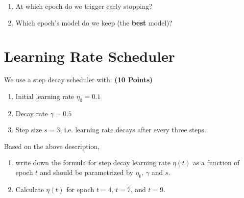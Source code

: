 \documentclass[12pt, xcolor=dvipsnames,svgnames,x11names]{article}
\begin{document}
\begin{enumerate}
\item At which epoch do we trigger early stopping?
\item Which epoch’s model do we keep (the \textbf{best} model)?
\end{enumerate}

\section{Learning Rate Scheduler}

We use a step decay scheduler with: \hfill \textbf{(10 Points)}

\begin{enumerate}
\item Initial learning rate $\eta_0 = 0.1$
\item Decay rate $\gamma = 0.5$
\item Step size $s = 3$, i.e. learning rate decays after every three steps.
\end{enumerate}

Based on the above description, 

\begin{enumerate}
\item write down the formula for step decay learning rate $\eta(t)$ as a function of epoch $t$ and should be parametrized by $\eta_0$, $\gamma$ and $s$.
\item Calculate $\eta(t)$ for epoch $t=4$, $t = 7$, and $t = 9$.
\end{enumerate}
\end{document}
